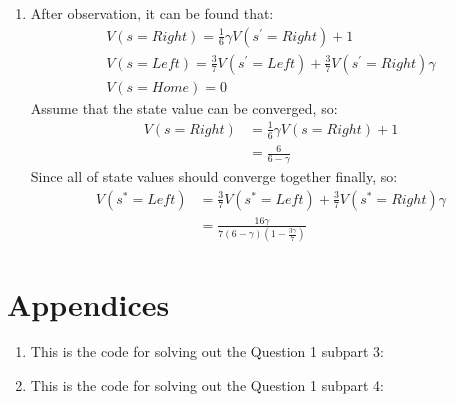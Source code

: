 \documentclass[12pt]{article}
\begin{document}
\begin{enumerate}
\begin{enumerate}
\newpage
\item After observation, it can be found that:\\
\begin{align}
V(s = Right) = \frac{1}{6} \gamma V(s^{'} = Right) + 1\\
V(s = Left) = \frac{3}{7} V(s^{'} = Left) + \frac{3}{7} V(s^{'} = Right)\gamma\\
V(s = Home) = 0
\end{align}
Assume that the state value can be converged, so:\\
\begin{align}
V(s = Right) &= \frac{1}{6} \gamma V(s = Right) + 1\\
&= \frac{6}{6 - \gamma}
\end{align}
Since all of state values should converge together finally, so:\\
\begin{align}
V(s^{*} = Left) &= \frac{3}{7} V(s^{*} = Left) + \frac{3}{7} V(s^{*} = Right)\gamma\\
&= \frac{16\gamma}{7(6 - \gamma)(1 - \frac{3\gamma}{7})}
\end{align}

\end{enumerate}
\end{enumerate}

\section{Appendices}
\begin{enumerate}
\item This is the code for solving out the Question 1 subpart 3:\\

\newpage
\item This is the code for solving out the Question 1 subpart 4:\\

\end{enumerate}
\end{document}
